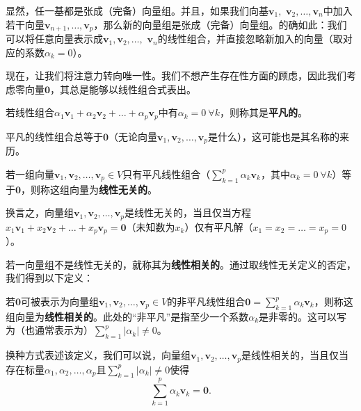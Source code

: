 显然，任一基都是张成（完备）向量组。并且，如果我们向基$\mathbf{v}_{1},$ $\mathbf{v}_{2},\ldots,\mathbf{v}_{n}$中加入若干向量$\mathbf{v}_{n+1},\ldots,\mathbf{v}_{p}$，那么新的向量组是张成（完备）向量组。的确如此：我们可以将任意向量表示成$\mathbf{v}_{1},\mathbf{v}_{2},\ldots,$ $\mathbf{v}_{n}$的线性组合，并直接忽略新加入的向量（取对应的系数$\alpha_k=0$）。

现在，让我们将注意力转向唯一性。我们不想产生存在性方面的顾虑，因此我们考虑零向量$\mathbf{0}$，其总是能够以线性组合式表出。

\begin{definition*}
    若线性组合$\alpha_{1}\mathbf{v}_{1}+\alpha_{2}\mathbf{v}_{2}+\ldots+\alpha_{p}\mathbf{v}_{p}$中有$\alpha_k = 0\ \forall k$，则称其是{\bf 平凡的}。
\end{definition*}

平凡的线性组合总等于$\mathbf{0}$（无论向量$\mathbf{v}_1,\mathbf{v}_2,\ldots,\mathbf{v}_p$是什么），这可能也是其名称的来历。

\begin{definition*}
    若一组向量$\mathbf{v}_{1},\mathbf{v}_{2},\ldots,\mathbf{v}_{p}\in V$只有平凡线性组合（$\sum_{k=1}^{p}\alpha_{k}\mathbf{v}_{k}$，其中$\alpha_{k}=0\ \forall k$）等于$\mathbf{0}$，则称这组向量为{\bf 线性无关的}。

    换言之，向量组$\mathbf{v}_{1},\mathbf{v}_{2},\ldots,\mathbf{v}_{p}$是线性无关的，当且仅当方程$x_1\mathbf{v}_1+x_2\mathbf{v}_2+\ldots+x_p\mathbf{v}_p=\mathbf{0}$（未知数为$x_k$）仅有平凡解（$x_{1}=x_{2}=\ldots=x_{p}=0$）。
\end{definition*}

若一向量组不是线性无关的，就称其为{\bf 线性相关的}。通过取线性无关定义的否定，我们得到以下定义：

\begin{definition*}
    若$\mathbf{0}$可被表示为向量组$\mathbf{v}_{1},\mathbf{v}_{2},\ldots,\mathbf{v}_{p}\in V$的非平凡线性组合$\mathbf{0}=\sum_{k=1}^{p}\alpha_{k}\mathbf{v}_{k}$，则称这组向量为{\bf 线性相关的}。此处的“非平凡”是指至少一个系数$\alpha_{k}$是非零的。这可以写为（也通常表示为）$\sum_{k=1}^{p}|\alpha_{k}|\neq0$。
\end{definition*}

换种方式表述该定义，我们可以说，向量组$\mathbf{v}_{1},\mathbf{v}_{2},\ldots,\mathbf{v}_{p}$是线性相关的，当且仅当存在标量$\alpha_1,\alpha_2,\ldots,\alpha_p$且$\sum_{k=1}^{p}|\alpha_{k}|\neq0$使得\[\sum_{k=1}^p\alpha_k\mathbf{v}_k=\mathbf{0}.\]

